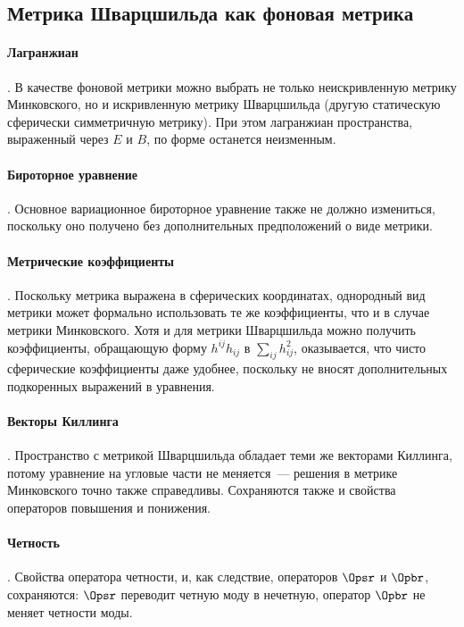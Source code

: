 \documentclass[\docroot/reports/draft/report.tex]{subfiles}
\begin{document}
\onlyinsubfile{\tableofcontents}

\subsection{Метрика Шварцшильда как фоновая метрика}

    \paragraph{Лагранжиан}. В качестве фоновой метрики можно выбрать не только неискривленную метрику Минковского, но и искривленную метрику Шварцшильда (другую статическую сферически симметричную метрику). При этом лагранжиан пространства, выраженный через $E$ и $B$, по форме останется неизменным.

    \paragraph{Бироторное уравнение}. Основное вариационное бироторное уравнение также не должно измениться, поскольку оно получено без дополнительных предположений о виде метрики.

    \paragraph{Метрические коэффициенты}. Поскольку метрика выражена в сферических координатах, однородный вид метрики может формально использовать те же коэффициенты, что и в случае метрики Минковского. Хотя и для метрики Шварцшильда можно получить коэффициенты, обращающую форму $h^{ij}h_{ij}$ в $\sum_{ij} h^2_{ij}$, оказывается, что чисто сферические коэффициенты даже удобнее, поскольку не вносят дополнительных подкоренных выражений в уравнения.

    \paragraph{Векторы Киллинга}. Пространство с метрикой Шварцшильда обладает теми же векторами Киллинга, потому уравнение на угловые части не меняется~--- решения в метрике Минковского точно также справедливы. Сохраняются также и свойства операторов повышения и понижения.

    \paragraph{Четность}. Свойства оператора четности, и, как следствие, операторов $\Opsr$ и $\Opbr$, сохраняются: $\Opsr$ переводит четную моду в нечетную, оператор $\Opbr$ не меняет четности моды.
\end{document}
